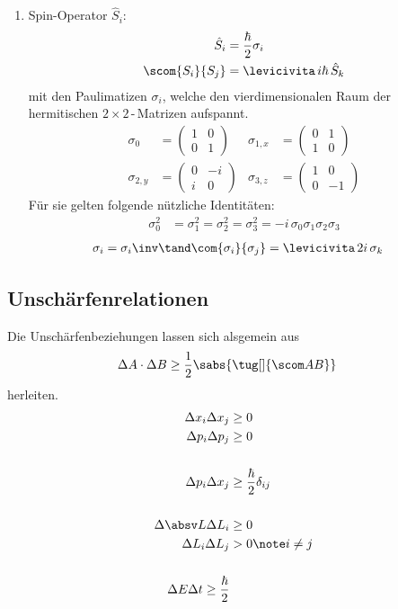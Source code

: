 \documentclass[twocolumn, unnumberedsubsub]{summery_3.1}
\begin{document}
\begin{enumerate}
    \item Spin-Operator \(\hat S_i\):
    \begin{align*}
        \hat S_i &= \frac\hbar2 \sigma_i\\
        \scom{S_i}{S_j} &= \levicivita  \,i\hbar\,  \hat S_k
    \end{align*}
    mit den Paulimatizen \(\sigma_i\), welche den vierdimensionalen Raum der 
    hermitischen \(2\!\times\!2\)\(\,\)-\(\,\)Matrizen aufspannt.
    \begin{align*}
    \sigma_{0} &= \begin{pmatrix}1&0\\0&1\end{pmatrix}&
    \sigma_{1,x} &= \begin{pmatrix}0&1\\1&0\end{pmatrix}\\
    \sigma_{2,y} &= \begin{pmatrix}0&-i\\i&0\end{pmatrix}&
    \sigma_{3,z} &= \begin{pmatrix}1&0\\0&-1\end{pmatrix}
    \end{align*}
    Für sie gelten folgende nützliche Identitäten:
    \begin{align*}
        \sigma_0^2 &= \sigma_1^2  
        = \sigma_2^2 = \sigma_3^2 = -i\,\sigma_0\sigma_1\sigma_2\sigma_3
    \end{align*}
    \begin{align*}
        \sigma_i &= \sigma_i \inv \tand \com{\sigma_i}{\sigma_j} = \levicivita \,2i\, \sigma_k
    \end{align*}
\end{enumerate}


\subsection{Unschärfenrelationen}
Die Unschärfenbeziehungen lassen sich alsgemein aus 
\begin{align*}
    \Delta A \cdot \Delta B &\ge \frac12 \sabs{\tug[]{\scom AB}}
\end{align*}
herleiten.
\begin{align*}
    \Delta x_i \Delta x_j &\ge 0\\
    \Delta p_i \Delta p_j &\ge 0\\
    \\
    \Delta p_i \Delta x_j& \ge \frac \hbar 2 \delta_{ij}\\
    \\
    \Delta \absv L \Delta L_i &\ge 0\\
    \Delta L_i \Delta L_j &> 0\note i\neq j\\
    \\
    \Delta E \Delta t \ge \frac \hbar 2\\
\end{align*}
\end{document}
